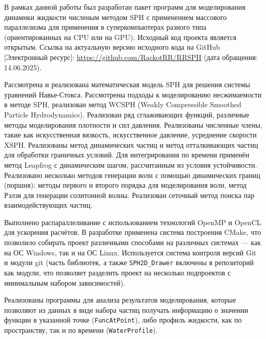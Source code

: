 

В рамках данной работы был разработан пакет программ
для моделирования динамики жидкости численым методом SPH
с применением массового параллелизма для применения в суперкомпьютерах
разного типа (ориентированных на CPU или на GPU).
%
Исходный код проекта является открытым.
%
Ссылка на актуальную версию исходного кода на GitHub [Электронный ресурс]: 
\url{https://github.com/RackotRR/RRSPH} (дата обращения: 14.06.2025).

Рассмотрена и реализована математическая модель SPH для решения системы уравнений Навье-Стокса.
%
Рассмотрены подходы к моделированию несжимаемости в методе SPH,
реализован метод WCSPH (Weakly Compressible Smoothed Particle Hydrodynamics).
%
Реализован ряд сглаживающих функций,
различные методы моделирования плотности и сил давления.
%
Реализованы численные члены, такие как 
искусственная вязкость,
искусственное давление,
усреднение скорости XSPH.
%
Реализованы метод динамических частиц и метод отталкивающих частиц для обработки граничных условий.
%
Для интегрирования по времени применён метод Leapfrog с динамическим шагом, рассчитанным из условия устойчивости.
%
Реализовано несколько методов генерации волн с помощью динамических границ (поршня):
методы первого и второго порядка для моделирования волн,
метод Рэлэя для генерации солитонной волны.
%
Реализован сеточный метод поиска пар взаимодействующих частиц.

Выполнено распараллеливание с использованием технологий OpenMP и OpenCL для ускорения расчётов.
%
В разработке применена система построения CMake, 
что позволило собирать проект различными способами на различных системах --- как на ОС Windows, так и на ОС Linux.
%
Используется система контроля версий Git и модули git (часть библиотек, 
а также \verb|SPH2D_Drawer| включены в репозиторий как модули,
что позволяет разделить проект на несколько подпроектов с минимальным набором зависимостей).

Реализованы программы для анализа результатов моделирования, 
которые позволяют из данных в виде набора частиц получать информацию о значении функции в указанной точке (\verb|FuncAtPoint|), 
либо профиль жидкости, как по пространству, так и по времени (\verb|WaterProfile|).

